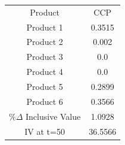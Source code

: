 \begin{tabular}{cc}
Product & CCP \\
Product 1 & 0.3515 \\
Product 2 & 0.002 \\
Product 3 & 0.0 \\
Product 4 & 0.0 \\
Product 5 & 0.2899 \\
Product 6 & 0.3566 \\
$\%\Delta$ Inclusive Value & 1.0928 \\
IV at t=50 & 36.5566 \\
\end{tabular}